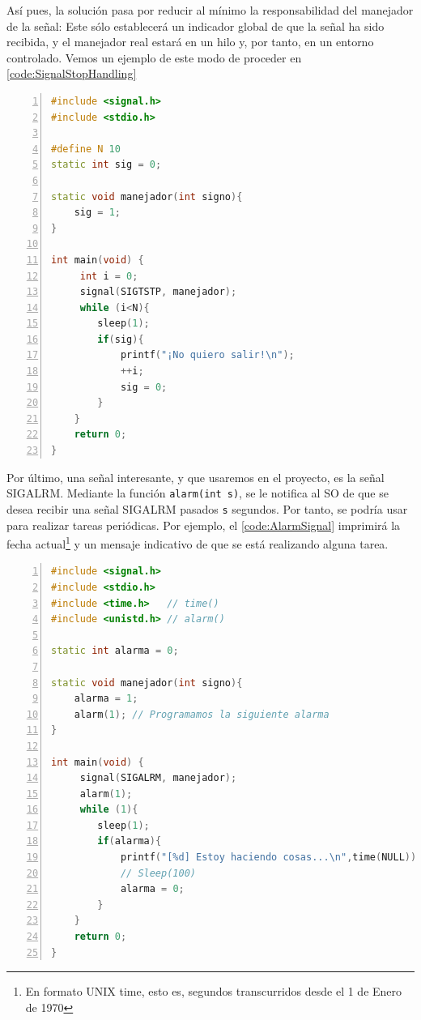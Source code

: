 Así pues, la solución pasa por reducir al mínimo la responsabilidad del manejador de la señal: Este sólo establecerá un 
indicador global de que la señal ha sido recibida, y el manejador real estará en un hilo y, por tanto, en un entorno 
controlado. Vemos un ejemplo de este modo de proceder en \lstlistingname{} \ref{code:SignalStopHandling}

\begin{lstlisting}[language=C++,caption={Manejo de la señal \gls{SIGTSTP}}, 
breaklines=true, label=code:SignalStopHandling,numbers=left,float=htbp]
#include <signal.h>
#include <stdio.h>

#define N 10
static int sig = 0;

static void manejador(int signo){
    sig = 1;
}

int main(void) {
     int i = 0;
     signal(SIGTSTP, manejador);
     while (i<N){
        sleep(1);
        if(sig){
            printf("¡No quiero salir!\n");
            ++i;
            sig = 0;
        }
    }
    return 0;
}
\end{lstlisting}

Por último, una señal interesante, y que usaremos en el proyecto, es la señal \gls{SIGALRM}. Mediante la función 
\texttt{alarm(int s)}, se le notifica al \gls{SO} de que se desea recibir una señal \gls{SIGALRM} pasados \texttt{s} 
segundos. Por tanto, se podría usar para realizar tareas periódicas. Por ejemplo, el \lstlistingname{} 
\ref{code:AlarmSignal} imprimirá la fecha actual\footnote{En formato UNIX time, esto es, segundos transcurridos desde 
el 1 de Enero de 1970} y un mensaje indicativo de que se está realizando alguna tarea.

\begin{lstlisting}[language=C++,caption={Ejemplo de uso de \gls{SIGALRM}}, 
breaklines=true, label=code:AlarmSignal,numbers=left,float=htbp]
#include <signal.h>
#include <stdio.h>
#include <time.h>   // time()
#include <unistd.h> // alarm()

static int alarma = 0;

static void manejador(int signo){
    alarma = 1;
    alarm(1); // Programamos la siguiente alarma
}

int main(void) {
     signal(SIGALRM, manejador);
     alarm(1);
     while (1){
        sleep(1);
        if(alarma){
            printf("[%d] Estoy haciendo cosas...\n",time(NULL));
            // Sleep(100)
            alarma = 0;
        }
    }
    return 0;
}
\end{lstlisting}

